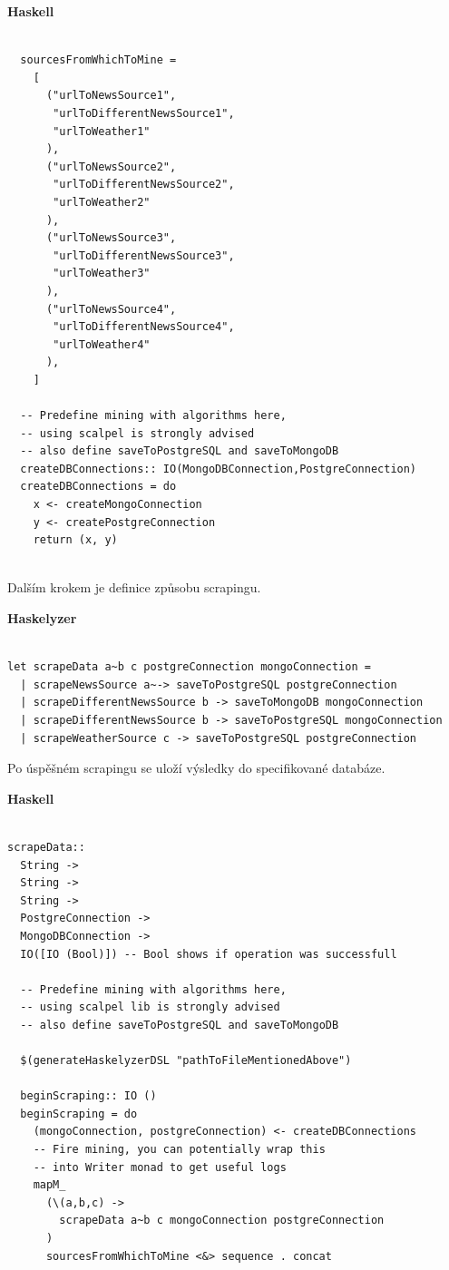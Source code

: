 \documentclass[male, czech]{kithesis}
\begin{document}
\newpage
\textbf{Haskell}
\begin{verbatim}

  sourcesFromWhichToMine = 
    [
      ("urlToNewsSource1", 
       "urlToDifferentNewsSource1",
       "urlToWeather1"
      ),
      ("urlToNewsSource2", 
       "urlToDifferentNewsSource2",
       "urlToWeather2"
      ),
      ("urlToNewsSource3", 
       "urlToDifferentNewsSource3",
       "urlToWeather3"
      ),
      ("urlToNewsSource4", 
       "urlToDifferentNewsSource4",
       "urlToWeather4"
      ),
    ]
  
  -- Predefine mining with algorithms here, 
  -- using scalpel is strongly advised
  -- also define saveToPostgreSQL and saveToMongoDB
  createDBConnections:: IO(MongoDBConnection,PostgreConnection)
  createDBConnections = do
    x <- createMongoConnection 
    y <- createPostgreConnection 
    return (x, y)
  
\end{verbatim}

Dalším krokem je definice způsobu scrapingu. 

\textbf{Haskelyzer}
\begin{verbatim}

let scrapeData a~b c postgreConnection mongoConnection = 
  | scrapeNewsSource a~-> saveToPostgreSQL postgreConnection
  | scrapeDifferentNewsSource b -> saveToMongoDB mongoConnection
  | scrapeDifferentNewsSource b -> saveToPostgreSQL mongoConnection
  | scrapeWeatherSource c -> saveToPostgreSQL postgreConnection

\end{verbatim}

Po úspěšném scrapingu se uloží výsledky do specifikované databáze.

\textbf{Haskell}
\begin{verbatim}

scrapeData:: 
  String -> 
  String -> 
  String -> 
  PostgreConnection -> 
  MongoDBConnection -> 
  IO([IO (Bool)]) -- Bool shows if operation was successfull

  -- Predefine mining with algorithms here, 
  -- using scalpel lib is strongly advised
  -- also define saveToPostgreSQL and saveToMongoDB

  $(generateHaskelyzerDSL "pathToFileMentionedAbove")

  beginScraping:: IO ()
  beginScraping = do
    (mongoConnection, postgreConnection) <- createDBConnections
    -- Fire mining, you can potentially wrap this 
    -- into Writer monad to get useful logs
    mapM_ 
      (\(a,b,c) -> 
        scrapeData a~b c mongoConnection postgreConnection
      ) 
      sourcesFromWhichToMine <&> sequence . concat
\end{verbatim}
\newpage
\end{document}
